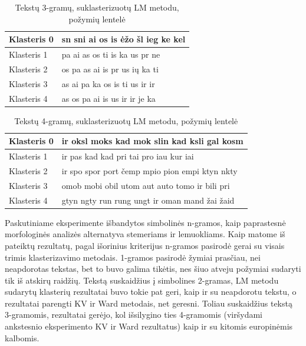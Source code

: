\documentclass{VUMIFInfBakalaurinis}
\begin{document}
\begin{table}[H]
  \centering
  \caption{Tekstų 3-gramų, suklasterizuotų LM metodu, požymių lentelė}
  \small
  \begin{tabular}{|l|l|}
  \hline
  Klasteris 0 & sn sni ai os is ėžo šl ieg ke kel \\ \hline
  Klasteris 1 & pa ai as os ti is ka us pr ne     \\ \hline
  Klasteris 2 & os pa as ai is pr us ių ka ti     \\ \hline
  Klasteris 3 & as ai pa ka os is ti us ir ir     \\ \hline
  Klasteris 4 & as os pa ai is us ir ir je ka     \\ \hline
  \end{tabular}
  \normalsize
\end{table}

\begin{table}[H]
  \centering
  \caption{Tekstų 4-gramų, suklasterizuotų LM metodu, požymių lentelė}
  \small
  \begin{tabular}{|l|l|}
  \hline
  Klasteris 0 & ir oksl moks kad mok slin kad ksli gal kosm    \\ \hline
  Klasteris 1 & ir pas kad kad pri tai pro iau kur iai         \\ \hline
  Klasteris 2 & ir spo spor port čemp mpio pion empi ktyn nkty \\ \hline
  Klasteris 3 & omob mobi obil utom aut auto tomo ir bili pri  \\ \hline
  Klasteris 4 & gtyn ngty run rung ungt ir oman mand žai žaid  \\ \hline
  \end{tabular}
  \normalsize
\end{table}

Paskutiniame eksperimente išbandytos simbolinės n-gramos, kaip
paprastesnė morfologinės analizės alternatyva stemeriams ir lemuokliams.
Kaip matome iš pateiktų rezultatų, pagal išorinius kriterijus n-gramos
pasirodė gerai su visais trimis klasterizavimo metodais. 1-gramos
pasirodė žymiai prasčiau, nei neapdorotas tekstas, bet to buvo galima
tikėtis, nes šiuo atveju požymiai sudaryti tik iš atskirų raidžių.
Tekstą suskaidžius į simbolines 2-gramas, LM metodu sudarytų klasterių
rezultatai buvo tokie pat geri, kaip ir su neapdorotu tekstu, o
rezultatai parengti KV ir Ward metodais, net geresni. Toliau suskaidžius
tekstą 3-gramomis, rezultatai gerėjo, kol išsilygino ties 4-gramomis
(viršydami ankstesnio eksperimento KV ir Ward rezultatus) kaip ir su
kitomis europinėmis kalbomis.%
\end{document}
